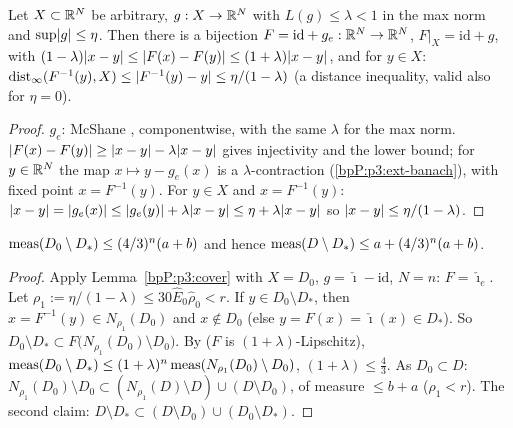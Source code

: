 \begin{lemma}\label{bpP:p3:cover}
Let $X\subset\mathbb{R}^N$ be arbitrary, $g:X\to\mathbb{R}^N$ with $L(g)\le\lambda<1$ in the max norm and $\sup\lvert g\rvert\le\eta$. Then there is a bijection $F=\mathrm{id}+g_e:\mathbb{R}^N\to\mathbb{R}^N$, $F|_X=\mathrm{id}+g$, with $(1-\lambda)\lvert x-y\rvert\le\lvert F(x)-F(y)\rvert\le(1+\lambda)\lvert x-y\rvert$, and for $y\in X$: $\operatorname{dist}_\infty(F^{-1}(y),X)\le\lvert F^{-1}(y)-y\rvert\le\eta/(1-\lambda)$ (a distance inequality, valid also for $\eta=0$).
\end{lemma}
\begin{proof}
\label{stepP:p3:cv-ext}
$g_e$: McShane , componentwise, with the same $\lambda$ for the max norm.
\label{stepP:p3:cv-bij}
$\lvert F(x)-F(y)\rvert\ge\lvert x-y\rvert-\lambda\lvert x-y\rvert$ gives injectivity and the lower bound; for $y\in\mathbb{R}^N$ the map $x\mapsto y-g_e(x)$ is a $\lambda$-contraction (\ref{bpP:p3:ext-banach}), with fixed point $x=F^{-1}(y)$.
\label{stepP:p3:cv-loc}
For $y\in X$ and $x=F^{-1}(y)$: $\lvert x-y\rvert=\lvert g_e(x)\rvert\le\lvert g_e(y)\rvert+\lambda\lvert x-y\rvert\le\eta+\lambda\lvert x-y\rvert$ so $\lvert x-y\rvert\le\eta/(1-\lambda)$.
\end{proof}

\begin{lemma}\label{bpP:p3:meas-actions}
$\operatorname{meas}(D_0\setminus D_*)\le(4/3)^n(a+b)$ and hence $\operatorname{meas}(D\setminus D_*)\le a+(4/3)^n(a+b)$.
\end{lemma}
\begin{proof}
\label{stepP:p3:ma-ext}
Apply Lemma~\ref{bpP:p3:cover} with $X=D_0$, $g=\check\imath-\mathrm{id}$, $N=n$: $F=\check\imath_e$. Let $\rho_1:=\eta/(1-\lambda)\le30\hat E_0\hat\rho_0<r$. If $y\in D_0\setminus D_*$, then $x=F^{-1}(y)\in N_{\rho_1}(D_0)$ and $x\notin D_0$ (else $y=F(x)=\check\imath(x)\in D_*$). So $D_0\setminus D_*\subset F\bigl(N_{\rho_1}(D_0)\setminus D_0\bigr)$.
\label{stepP:p3:ma-meas}
By  ($F$ is $(1+\lambda)$-Lipschitz), $\operatorname{meas}(D_0\setminus D_*)\le(1+\lambda)^n\operatorname{meas}(N_{\rho_1}(D_0)\setminus D_0)$, $(1+\lambda)\le\frac43$. As $D_0\subset D$: $N_{\rho_1}(D_0)\setminus D_0\subset(N_{\rho_1}(D)\setminus D)\cup(D\setminus D_0)$, of measure $\le b+a$ ($\rho_1<r$). The second claim: $D\setminus D_*\subset(D\setminus D_0)\cup(D_0\setminus D_*)$.
\end{proof}

